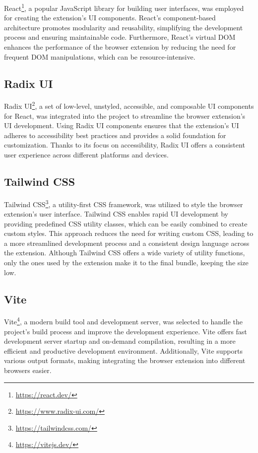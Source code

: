 React\footnote{\url{https://react.dev/}}, a popular JavaScript library for building user interfaces, was employed for creating the extension's UI components. React's component-based architecture promotes modularity and reusability, simplifying the development process and ensuring maintainable code. Furthermore, React's virtual DOM enhances the performance of the browser extension by reducing the need for frequent DOM manipulations, which can be resource-intensive.

\subsection{Radix UI}

Radix UI\footnote{\url{https://www.radix-ui.com/}}, a set of low-level, unstyled, accessible, and composable UI components for React, was integrated into the project to streamline the browser extension's UI development. Using Radix UI components ensures that the extension's UI adheres to accessibility best practices and provides a solid foundation for customization. Thanks to its focus on accessibility, Radix UI offers a consistent user experience across different platforms and devices.

\subsection{Tailwind CSS}

Tailwind CSS\footnote{\url{https://tailwindcss.com/}}, a utility-first CSS framework, was utilized to style the browser extension's user interface. Tailwind CSS enables rapid UI development by providing predefined CSS utility classes, which can be easily combined to create custom styles. This approach reduces the need for writing custom CSS, leading to a more streamlined development process and a consistent design language across the extension. Although Tailwind CSS offers a wide variety of utility functions, only the ones used by the extension make it to the final bundle, keeping the size low.

\subsection{Vite}

Vite\footnote{\url{https://vitejs.dev/}}, a modern build tool and development server, was selected to handle the project's build process and improve the development experience. Vite offers fast development server startup and on-demand compilation, resulting in a more efficient and productive development environment. Additionally, Vite supports various output formats, making integrating the browser extension into different browsers easier. 
	
